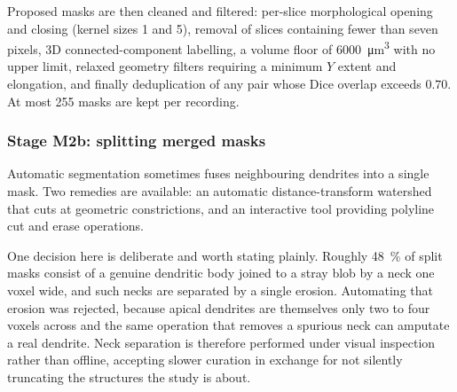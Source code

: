 			Proposed masks are then cleaned and filtered: per-slice
			morphological opening and closing (kernel sizes 1 and 5), removal of
			slices containing fewer than seven pixels, 3D connected-component
			labelling, a volume floor of \SI{6000}{\micro\meter\cubed} with no
			upper limit, relaxed geometry filters requiring a minimum $Y$ extent
			and elongation, and finally deduplication of any pair whose Dice
			overlap exceeds $0.70$. At most 255 masks are kept per recording.


		\subsubsection{Stage M2b: splitting merged masks}

			Automatic segmentation sometimes fuses neighbouring dendrites into a
			single mask. Two remedies are available: an automatic
			distance-transform watershed that cuts at geometric constrictions,
			and an interactive \napari{} tool providing polyline cut and erase
			operations.

			One decision here is deliberate and worth stating plainly.
			Roughly \SI{48}{\percent} of split masks consist of a genuine
			dendritic body joined to a stray blob by a neck one voxel wide, and
			such necks are separated by a single erosion.
			Automating that erosion was rejected, because apical dendrites are
			themselves only two to four voxels across and the same operation that
			removes a spurious neck can amputate a real dendrite.
			Neck separation is therefore performed under visual inspection rather
			than offline, accepting slower curation in exchange for not silently
			truncating the structures the study is about.

